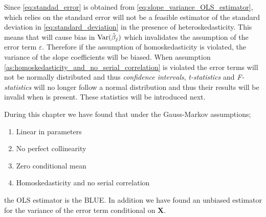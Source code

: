 Since \eqref{eq:standad_error} is obtained from \eqref{eq:slope_variance_OLS_estimator}, which relies on \homo the standard error will not be a feasible estimator of the standard deviation in \eqref{eq:standard_deviation} in the presence of heteroskedasticity. This means that \hetero will cause bias in $\operatorname{\text{Var}}(\hat{\beta}_j)$ which invalidates the assumption of the error term $\varepsilon$.
Therefore if the assumption of homoskedasticity is violated, the variance of the slope coefficients will be biased. When assumption \ref{as:homoskedasticity_and_no_serial_correlation} is violated the error terms will not be normally distributed and thus \textit{confidence intervals}, \textit{t-statistics} and \textit{F-statistics} will no longer follow a normal distribution and thus their results will be invalid when \hetero is present. These statistics will be introduced next.

During this chapter we have found that under the Gauss-Markov assumptions;
\begin{enumerate}
    \item Linear in parameters
    \item No perfect collinearity
    \item Zero conditional mean
    \item Homoskedasticity and no serial correlation
\end{enumerate}
 the OLS estimator is the BLUE. 
 In addition we have found an unbiased estimator for the variance of the error term conditional on $\textbf{X}$.